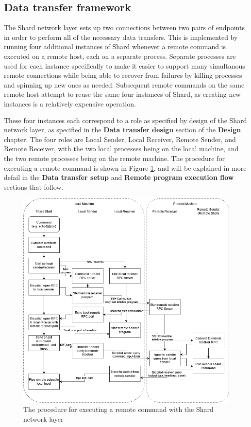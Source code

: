 \documentclass[twoside]{report}
\begin{document}
\subsection{Data transfer framework}

The Shard network layer sets up two connections between two pairs of endpoints in order to perform all of the necessary data transfers.
This is implemented by running four additional instances of Shard whenever a remote command is executed on a remote host, each on a separate process.
Separate processes are used for each instance specifically to make it easier to support many simultanous remote connections while being able to recover from failures by killing processes and spinning up new ones as needed.
Subsequent remote commands on the same remote host attempt to reuse the same four instances of Shard, as creating new instances is a relatively expensive operation.

These four instances each correspond to a role as specified by design of the Shard network layer, as specified in the \textbf{Data transfer design} section of the \textbf{Design} chapter.
The four roles are Local Sender, Local Receiver, Remote Sender, and Remote Receiver, with the two local processes being on the local machine, and the two remote processes being on the remote machine.
The procedure for executing a remote command is shown in Figure \ref{fig:network_layer_impl}, and will be explained in more defail in the \textbf{Data transfer setup} and \textbf{Remote program execution flow} sections that follow.

\begin{figure}[h]
  \begin{center}
    \includegraphics[scale=0.5]{img/shard_protocol_impl.png}
    \caption{The procedure for executing a remote command with the Shard network layer}
    \label{fig:network_layer_impl}
  \end{center}
\end{figure}
\end{document}
